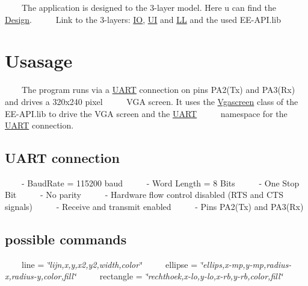 ~~~~The application is designed to the 3-\/layer model. Here u can find the \mbox{\hyperlink{_design}{Design}}.~\newline
 ~~~~Link to the 3-\/layers\+: \mbox{\hyperlink{namespace_i_o}{IO}}, \mbox{\hyperlink{namespace_u_i}{UI}} and \mbox{\hyperlink{namespace_l_l}{LL}} and the used E\+E-\/\+A\+P\+I.\+lib~\newline
\hypertarget{index_usage_sec}{}\section{Usasage}\label{index_usage_sec}
~~~~The program runs via a \mbox{\hyperlink{namespace_u_a_r_t}{U\+A\+RT}} connection on pins P\+A2(\+Tx) and P\+A3(\+Rx) and drives a 320x240 pixel~\newline
 ~~~~V\+GA screen. It uses the \mbox{\hyperlink{class_vgascreen}{Vgascreen}} class of the E\+E-\/\+A\+P\+I.\+lib to drive the V\+GA screen and the \mbox{\hyperlink{namespace_u_a_r_t}{U\+A\+RT}}~\newline
 ~~~~namespace for the \mbox{\hyperlink{namespace_u_a_r_t}{U\+A\+RT}} connection.~\newline
\hypertarget{index_uart_sec}{}\subsection{U\+A\+R\+T connection}\label{index_uart_sec}
~~~~-\/ Baud\+Rate = 115200 baud~\newline
 ~~~~-\/ Word Length = 8 Bits~\newline
 ~~~~-\/ One Stop Bit~\newline
 ~~~~-\/ No parity~\newline
 ~~~~-\/ Hardware flow control disabled (R\+TS and C\+TS signals)~\newline
 ~~~~-\/ Receive and transmit enabled~\newline
 ~~~~-\/ Pins P\+A2(\+Tx) and P\+A3(\+Rx)~\newline
\hypertarget{index_input_sec}{}\subsection{possible commands}\label{index_input_sec}
~~~~line = {\itshape \char`\"{}lijn,x,y,x2,y2,width,color\char`\"{}}~\newline
 ~~~~ellipse = {\itshape \char`\"{}ellips,x-\/mp,y-\/mp,radius-\/x,radius-\/y,color,fill\char`\"{}}~\newline
 ~~~~rectangle = {\itshape \char`\"{}rechthoek,x-\/lo,y-\/lo,x-\/rb,y-\/rb,color,fill\char`\"{}}~\newline
